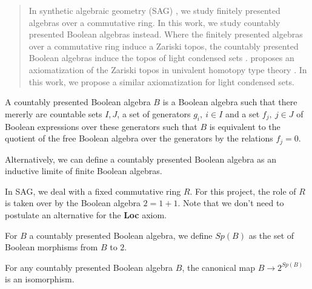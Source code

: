 \begin{abstract}
In synthetic algebraic geometry (SAG) \cite{draft}, we study finitely presented algebras over a commutative ring. 
In this work, we study countably presented Boolean algebras instead. 
Where the finitely presented algebras over a commutative ring induce a Zariski topos, 
the countably presented Boolean algebras induce the topos of light condensed sets \cite{TODO}. 
\cite{draft} proposes an axiomatization of the Zariski topos in univalent homotopy type theory \cite{HoTT}. 
In this work, we propose a similar axiomatization for light condensed sets. 
\end{abstract} 

\begin{definition}
  A countably presented Boolean algebra $B$ is a Boolean algebra such that there mererly are countable sets $I,J$, 
  a set of generators $g_i,~{i\in I}$ and a set $f_j,~{j\in J}$ of Boolean expressions over these generators 
  such that $B$ is equivalent to the quotient of the free Boolean algebra over the generators by the relations
  $f_j=0$.
\end{definition} 

 Alternatively, we can define a countably presented Boolean algebra as an inductive limite of finite Boolean algebras.

 \medskip

In SAG, we deal with a fixed commutative ring $R$. For this project, the role of $R$ is taken over by 
the Boolean algebra $2 = 1+1$. Note that we don't need to postulate an alternative for the \textbf{Loc} axiom. 


\begin{definition}
  For $B$ a countably presented Boolean algebra, we define $Sp(B)$ as the set of Boolean morphisms from $B$ to $2$. 
\end{definition}

\begin{axiom}
  For any countably presented Boolean algebra $B$, the canonical map   $B\rightarrow  2^{Sp(B)}$ is an isomorphism.
\end{axiom} 

